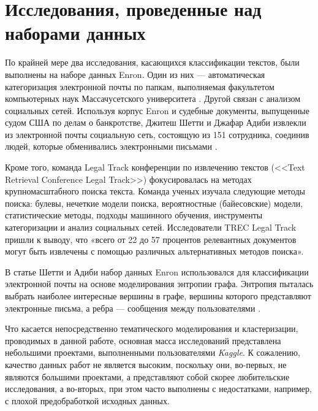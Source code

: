 \section{Исследования, проведенные над наборами данных}

По крайней мере два исследования, касающихся классификации текстов, были выполнены на наборе данных Enron. Один из них --- автоматическая категоризация электронной почты по папкам, выполняемая факультетом компьютерных наук Массачусетского университета \cite{bib_5}. Другой связан с анализом социальных сетей. Используя корпус Enron и судебные документы, выпущенные судом США по делам о банкротстве, Джитеш Шетти и Джафар Адиби извлекли из электронной почты социальную сеть, состоящую из 151 сотрудника, соединив людей, которые обменивались электронными письмами \cite{bib_6}.

Кроме того, команда Legal Track конференции по извлечению текстов (<<Text Retrieval Conference Legal Track>>) фокусировалась на методах крупномасштабного поиска текста. Команда ученых изучала следующие методы поиска: булевы, нечеткие модели поиска, вероятностные (байесовские) модели, статистические методы, подходы машинного обучения, инструменты категоризации и анализ социальных сетей. Исследователи TREC Legal Track пришли к выводу, что «всего от 22 до 57 процентов релевантных документов могут быть извлечены с помощью различных альтернативных методов поиска».

В статье Шетти и Адиби набор данных Enron использовался для классификации электронной почты на основе моделирования энтропии графа. Энтропия пыталась выбрать наиболее интересные вершины в графе, вершины которого представляют электронные письма, а ребра --- сообщения между пользователями \cite{bib_7}.

Что касается непосредственно тематического моделирования и кластеризации, проводимых в данной работе, основная масса исследований представлена небольшими проектами, выполненными пользователями \textit{Kaggle}. К сожалению, качество данных работ не является высоким, поскольку они, во-первых, не являются большими проектами, а представляют собой скорее любительские исследования, а во-вторых, при этом часто выполнены с недостатками, например, с плохой предобработкой исходных данных. 